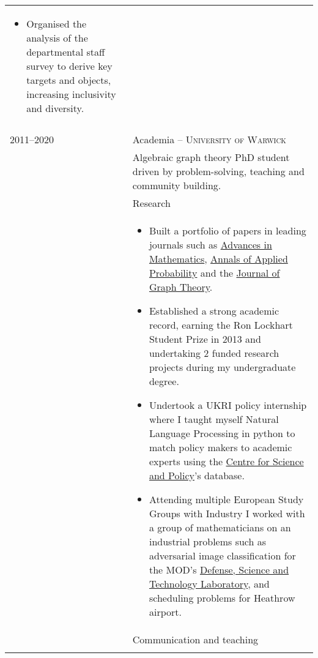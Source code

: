 \documentclass[a4paper,10pt]{article}
\newcommand{\tab}{\hspace{10 pt}}
\begin{document}
\begin{tabular}{p{2.25cm}|p{15cm}}
\begin{itemize}
 	 	\item Organised the analysis of the departmental staff survey to derive key targets and objects, increasing inclusivity and diversity.	\end{itemize}\vspace{-0.15 in}\\ 
\multicolumn{2}{c}{} \\
%
%
	\textsc{2011--2020} & \large{Academia -- \textsc{University of Warwick}}\\
	 & Algebraic graph theory PhD student driven by problem-solving, teaching and community building.\vspace{0.05 in}\\
  	 & \tab \large{Research}\\
	 & \vspace{-0.07 in}\begin{itemize}
	\item Built a portfolio of papers in leading journals such as \href{https://www.sciencedirect.com/science/article/pii/S0001870818303347}{Advances in Mathematics}, \href{https://projecteuclid.org/journals/annals-of-applied-probability/volume-32/issue-1/From-the-Bernoulli-factory-to-a-dice-enterprise-via-perfect/10.1214/21-AAP1679.short}{Annals of Applied Probability} and the \href{http://onlinelibrary.wiley.com/doi/10.1002/jgt.22002/abstract}{Journal of Graph Theory}.
	\item Established a strong academic record, earning the Ron Lockhart Student Prize in 2013 and undertaking 2 funded research projects during my undergraduate degree. 
	\item Undertook a UKRI policy internship where I taught myself Natural Language Processing in python to match policy makers to academic experts using the \href{https://www.csap.cam.ac.uk/}{Centre for Science and Policy}'s database.
	\item Attending multiple European Study Groups with Industry I worked with a group of mathematicians on an industrial problems such as adversarial image classification for the MOD's \href{https://www.gov.uk/government/organisations/defence-science-and-technology-laboratory}{Defense, Science and Technology Laboratory}, and scheduling problems for Heathrow airport.
	\end{itemize}\vspace{-0.15 in}\\ 
  	 & \tab \large{Communication and teaching}\\
	 & \vspace{-0.07 in}\begin{itemize}

\end{itemize}
\end{tabular}
\end{document}
